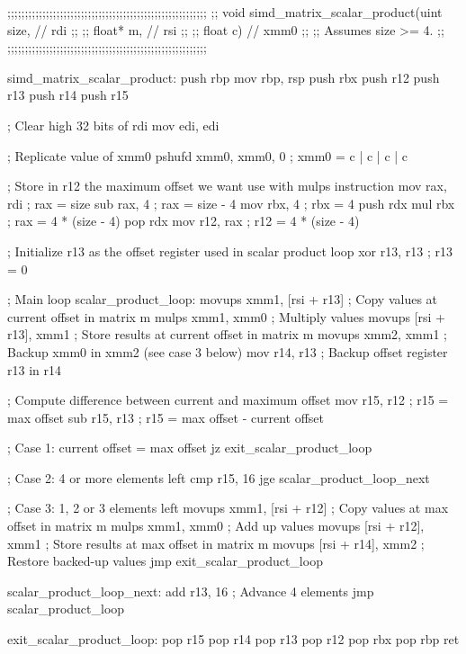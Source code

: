 \documentclass[a4paper, 10pt, twoside]{article}
\begin{document}
\begin{code}
  ;;;;;;;;;;;;;;;;;;;;;;;;;;;;;;;;;;;;;;;;;;;;;;;;;;;;;;;;;
  ;; void simd_matrix_scalar_product(uint size,  // rdi  ;;
  ;;                                 float* m,   // rsi  ;;
  ;;                                 float c)    // xmm0 ;;
  ;; Assumes size >= 4.                                  ;;
  ;;;;;;;;;;;;;;;;;;;;;;;;;;;;;;;;;;;;;;;;;;;;;;;;;;;;;;;;;

  simd_matrix_scalar_product:
    push rbp
    mov rbp, rsp
    push rbx
    push r12
    push r13
    push r14
    push r15

    ; Clear high 32 bits of rdi
    mov edi, edi

    ; Replicate value of xmm0
    pshufd xmm0, xmm0, 0      ; xmm0 = c | c | c | c

    ; Store in r12 the maximum offset we want use with mulps instruction
    mov rax, rdi              ; rax = size
    sub rax, 4                ; rax = size - 4
    mov rbx, 4                ; rbx = 4
    push rdx
    mul rbx                   ; rax = 4 * (size - 4)
    pop rdx
    mov r12, rax              ; r12 = 4 * (size - 4)

    ; Initialize r13 as the offset register used in scalar product loop
    xor r13, r13              ; r13 = 0

    ; Main loop
  scalar_product_loop:
    movups xmm1, [rsi + r13]  ; Copy values at current offset in matrix m
    mulps xmm1, xmm0          ; Multiply values
    movups [rsi + r13], xmm1  ; Store results at current offset in matrix m
    movups xmm2, xmm1         ; Backup xmm0 in xmm2 (see case 3 below)
    mov r14, r13              ; Backup offset register r13 in r14

    ; Compute difference between current and maximum offset
    mov r15, r12              ; r15 = max offset
    sub r15, r13              ; r15 = max offset - current offset

    ; Case 1: current offset = max offset
    jz exit_scalar_product_loop

    ; Case 2: 4 or more elements left
    cmp r15, 16
    jge scalar_product_loop_next

    ; Case 3: 1, 2 or 3 elements left
    movups xmm1, [rsi + r12]  ; Copy values at max offset in matrix m
    mulps xmm1, xmm0          ; Add up values
    movups [rsi + r12], xmm1  ; Store results at max offset in matrix m
    movups [rsi + r14], xmm2  ; Restore backed-up values
    jmp exit_scalar_product_loop

  scalar_product_loop_next:
    add r13, 16               ; Advance 4 elements
    jmp scalar_product_loop

  exit_scalar_product_loop:
    pop r15
    pop r14
    pop r13
    pop r12
    pop rbx
    pop rbp
    ret
\end{code}
\end{document}
